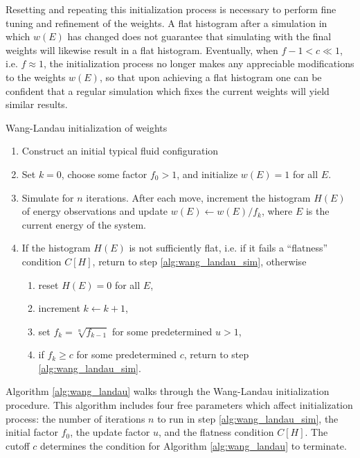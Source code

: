 \documentclass[11pt]{article}
\newcommand{\p}[1]{\left(#1\right)} %
\renewcommand{\sp}[1]{\left[#1\right]} %
\newenvironment{alg}
{\hrulefill\begin{enumerate}}
{\end{enumerate}\hrulefill}
\begin{document}
Resetting and repeating this initialization process is necessary to
perform fine tuning and refinement of the weights. A flat histogram
after a simulation in which $w\p{E}$ has changed does not guarantee
that simulating with the final weights will likewise result in a flat
histogram. Eventually, when $f-1<c\ll 1$, i.e. $f\approx 1$, the
initialization process no longer makes any appreciable modifications
to the weights $w\p{E}$, so that upon achieving a flat histogram one
can be confident that a regular simulation which fixes the current
weights will yield similar results.

\begin{algorithm}[tb]
  \caption{Wang-Landau initialization of weights}
  \label{alg:wang_landau}
  \begin{alg}

  \item Construct an initial typical fluid configuration

  \item Set $k=0$, choose some factor $f_0>1$, and initialize
    $w\p{E}=1$ for all $E$.

  \item Simulate for $n$ iterations. After each move, increment the
    histogram $H\p{E}$ of energy observations and update
    $w\p{E}\leftarrow w\p{E}/f_k$, where $E$ is the current energy of
    the system.
    \label{alg:wang_landau_sim}

  \item If the histogram $H\p{E}$ is not sufficiently flat, i.e. if it
    fails a ``flatness'' condition $C\sp{H}$, return to step
    \ref{alg:wang_landau_sim}, otherwise
    \begin{enumerate}
    \item reset $H\p{E}=0$ for all $E$,
    \item increment $k\leftarrow k+1$,
    \item set $f_k=\sqrt[u]{f_{k-1}}$ for some predetermined $u>1$,
      \label{alg:wang_landau_update}
    \item if $f_k\ge c$ for some predetermined $c$, return to step
      \ref{alg:wang_landau_sim}.
      \label{alg:wang_landau_end}
    \end{enumerate}

  \end{alg}
\end{algorithm}

Algorithm \ref{alg:wang_landau} walks through the Wang-Landau
initialization procedure. This algorithm includes four free parameters
which affect initialization process: the number of iterations $n$ to
run in step \ref{alg:wang_landau_sim}, the initial factor $f_0$, the
update factor $u$, and the flatness condition $C\sp{H}$. The cutoff
$c$ determines the condition for Algorithm \ref{alg:wang_landau} to
terminate.
\end{document}
